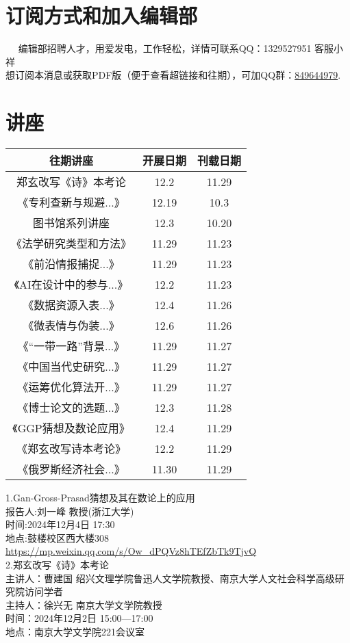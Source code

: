 \documentclass[letterpaper, 12pt]{article}
\begin{document}
\begin{multicols}{2}
    \section{订阅方式和加入编辑部}  
编辑部招聘人才，用爱发电，工作轻松，详情可联系QQ：1329527951 客服小祥\\想订阅本消息或获取PDF版（便于查看超链接和往期），可加QQ群：\href{https://qm.qq.com/q/VXIW7fgsEe}{849644979}.
\section{讲座}
\begin{tabular}{|c|c|c|}
    \hline
    往期讲座 & 开展日期 & 刊载日期\\
    \hline\hline
郑玄改写《诗》本考论 & 12.2 & 11.29\\
    《专利查新与规避...》 & 12.19 & 10.3\\
    图书馆系列讲座 & 12.3 & 10.20\\
    《法学研究类型和方法》 & 11.29 & 11.23\\
    《前沿情报捕捉...》 & 11.29 & 11.23\\
    《AI在设计中的参与...》 & 12.2 & 11.23\\
    《数据资源入表...》 & 12.4 & 11.26\\
    《微表情与伪装...》 & 12.6 & 11.26\\
    《“一带一路”背景...》& 11.29 & 11.27\\
    《中国当代史研究...》& 11.29 & 11.27\\
    《运筹优化算法开...》 & 11.29 & 11.27\\
    《博士论文的选题...》 & 12.3 & 11.28\\
    《GGP猜想及数论应用》 & 12.4 & 11.29\\
    《郑玄改写诗本考论》 & 12.2 & 11.29\\
    《俄罗斯经济社会...》&11.30&11.29\\
\hline
\end{tabular}

1.Gan-Gross-Prasad猜想及其在数论上的应用\\
报告人:刘一峰 教授(浙江大学)\\
时间:2024年12月4日 17:30\\
地点:鼓楼校区西大楼308\\
\url{https://mp.weixin.qq.com/s/Ow_dPQVz8hTEfZbTk9TjvQ}\\

2.郑玄改写《诗》本考论\\
主讲人：曹建国  绍兴文理学院鲁迅人文学院教授、南京大学人文社会科学高级研究院访问学者\\
主持人：徐兴无  南京大学文学院教授\\
时间：2024年12月2日 15:00—17:00\\
地点：南京大学文学院221会议室\\


\end{multicols}
\end{document}
